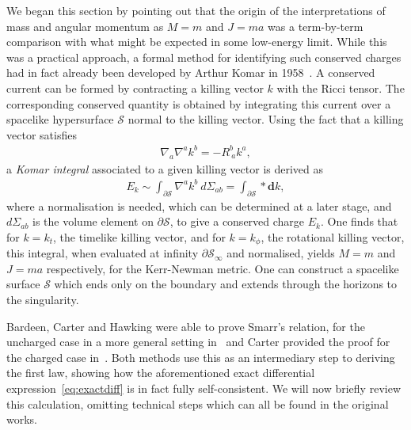 \documentclass[
twoside,
openright,
frontopenright,
]{dmathesis}
\begin{document}
We began this section by pointing out that the origin of the interpretations of
mass and angular momentum as $M = m$ and $J = ma$ was a term-by-term comparison
with what might be expected in some low-energy limit. While this was a practical
approach, a formal method for identifying such conserved charges had in fact
already been developed by Arthur Komar in 1958~\cite{Komar:1959aa}. A conserved
current can be formed by contracting a killing vector $k$ with the Ricci
tensor. The corresponding conserved quantity is obtained by integrating this
current over a spacelike hypersurface $\mathcal{S}$ normal to the killing
vector. Using the fact that a killing vector satisfies
\begin{align}
  \label{eq:killing}
  \nabla_a \nabla^a k^b = -R^b_{~a}k^a,
\end{align}
a \emph{Komar integral} associated to a given killing vector is derived
as
\begin{align}
  \label{eq:komar}
  E_k\sim\int_{\partial\mathcal{S}} \nabla^a k^b ~ d\Sigma_{ab} = \int_{\partial\mathcal{S}} * \mathrm{\mathbf{d}}k,
\end{align}
where a normalisation is needed, which can be determined at a later stage, and
$d\Sigma_{ab}$ is the volume element on $\partial \mathcal{S}$, to give a
conserved charge $E_k$. One finds that for $k = k_t$, the timelike killing
vector, and for $k = k_\phi$, the rotational killing vector, this integral, when
evaluated at infinity $\partial \mathcal{S}_\infty$ and normalised, yields
$M = m$ and $J = m a$ respectively, for the Kerr-Newman metric. One can
construct a spacelike surface $\mathcal{S}$ which ends only on the boundary and
extends through the horizons to the singularity.

Bardeen, Carter and Hawking were able to prove Smarr's relation, for the
uncharged case in a more general setting in~\cite{Bardeen:1973gs} and Carter
provided the proof for the charged case
in~\cite{Carter:1973rla,Carter2010}. Both methods use this as an intermediary
step to deriving the first law, showing how the aforementioned exact
differential expression~\eqref{eq:exactdiff} is in fact fully
self-consistent. We will now briefly review this calculation, omitting technical
steps which can all be found in the original works.
\end{document}
